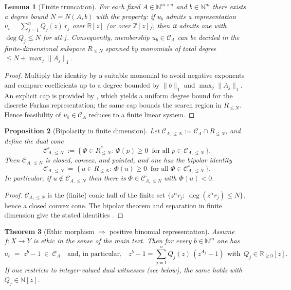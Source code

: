 \documentclass[12pt]{article}
\theoremstyle{plain}
\newtheorem{theorem}{Theorem}[section]
\newtheorem{lemma}[theorem]{Lemma}
\newtheorem{proposition}[theorem]{Proposition}
\theoremstyle{definition}
\theoremstyle{remark}
\numberwithin{equation}{section}
\begin{document}
\begin{lemma}[Finite truncation]\label{lem:finite-truncation}
For each fixed $A\in\mathbb N^{m\times n}$ and $b\in\mathbb N^m$ there exists a degree bound $N=N(A,b)$ with the property:
if $u_b$ admits a representation $u_b=\sum_{j=1}^n Q_j(z)\,r_j$ over $\mathbb R[z]$ (or over $\mathbb Z[z]$), then it admits one with $\deg Q_j\le N$ for all $j$. Consequently, membership $u_b\in \mathcal C_A$ can be decided in the finite-dimensional subspace $R_{\le N}$ spanned by monomials of total degree $\le N+\max_j\|A_j\|_1$.
\end{lemma}

\begin{proof}
Multiply the identity by a suitable monomial to avoid negative exponents and compare coefficients up to a degree bounded by $\|b\|_1$ and $\max_j\|A_j\|_1$. An explicit cap is provided by \cite{Lasserre2003}, which yields a uniform degree bound for the discrete Farkas representation; the same cap bounds the search region in $R_{\le N}$. Hence feasibility of $u_b\in \mathcal C_A$ reduces to a finite linear system.
\end{proof}

\begin{proposition}[Bipolarity in finite dimension]\label{prop:bipolar}
Let $\mathcal C_{A,\le N}:=\mathcal C_A\cap R_{\le N}$, and define the dual cone
\[
\mathcal C_{A,\le N}^{\circ}\ :=\ \big\{\,\Phi\in R_{\le N}^*: \ \Phi(p)\ge 0\ \text{ for all } p\in \mathcal C_{A,\le N}\,\big\}.
\]
Then $\mathcal C_{A,\le N}$ is closed, convex, and pointed, and one has the bipolar identity
\[
\mathcal C_{A,\le N}\;=\;\{\,u\in R_{\le N}:\ \Phi(u)\ge 0\ \text{ for all } \Phi\in \mathcal C_{A,\le N}^{\circ}\,\}.
\]
In particular, if $u\notin \mathcal C_{A,\le N}$ then there is $\Phi\in\mathcal C_{A,\le N}^{\circ}$ with $\Phi(u)<0$.
\end{proposition}

\begin{proof}
$\mathcal C_{A,\le N}$ is the (finite) conic hull of the finite set $\{z^\alpha r_j:\ \deg(z^\alpha r_j)\le N\}$, hence a closed convex cone. The bipolar theorem and separation in finite dimension give the stated identities \cite{Rockafellar1970}.
\end{proof}

\begin{theorem}[Ethic morphism $\Rightarrow$ positive binomial representation]\label{thm:ethic-implies-positive}
Assume $f:X\to Y$ is ethic in the sense of the main text. Then for every $b\in\mathbb N^m$ one has
\[
u_b\;=\;z^b-1\ \in\ \mathcal C_A\quad\text{and, in particular,}\quad
z^b-1=\sum_{j=1}^n Q_j(z)\,(z^{A_j}-1)\ \ \text{with}\ \ Q_j\in \mathbb R_{\ge 0}[z].
\]
If one restricts to integer-valued dual witnesses (see below), the same holds with $Q_j\in\mathbb N[z]$.
\end{theorem}
\end{document}
